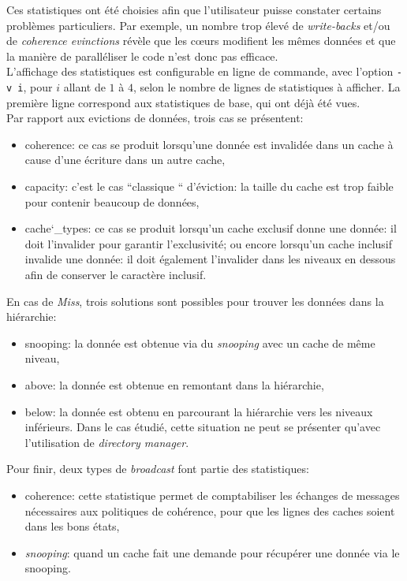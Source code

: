 Ces statistiques ont été choisies afin que l'utilisateur puisse constater certains problèmes particuliers. Par exemple, un nombre trop élevé de \emph{write-backs} et/ou de \emph{coherence evinctions} révèle que les c\oe urs modifient les mêmes données et que la manière de paralléliser le code n'est donc pas efficace. \\

L'affichage des statistiques est configurable en ligne de commande, avec l'option \texttt{-v i}, pour $i$ allant de $1$ à $4$, selon le nombre de lignes de statistiques à afficher. La première ligne correspond aux statistiques de base, qui ont déjà été vues. \\

Par rapport aux evictions de données, trois cas se présentent:
\begin{itemize}
\item coherence: ce cas se produit lorsqu'une donnée est invalidée dans un cache à cause d'une écriture dans un autre cache,
\item capacity: c'est le cas ``classique `` d'éviction: la taille du cache est trop faible pour contenir beaucoup de données,
\item cache\char`_types: ce cas se produit lorsqu'un cache exclusif donne une donnée: il doit l'invalider pour garantir l'exclusivité; ou encore lorsqu'un cache inclusif invalide une donnée: il doit également l'invalider dans les niveaux en dessous afin de conserver le caractère inclusif. \\ 
\end{itemize}

En cas de \emph{Miss}, trois solutions sont possibles pour trouver les données dans la hiérarchie:
\begin{itemize}
\item snooping: la donnée est obtenue via du \emph{snooping} avec un cache de même niveau,
\item above: la donnée est obtenue en remontant dans la hiérarchie,
\item below: la donnée est obtenu en parcourant la hiérarchie vers les niveaux inférieurs. Dans le cas étudié, cette situation ne peut se présenter qu'avec l'utilisation de \emph{directory manager}. \\
\end{itemize}

Pour finir, deux types de \emph{broadcast} font partie des statistiques:
\begin{itemize}
\item coherence: cette statistique permet de comptabiliser les échanges de messages nécessaires aux politiques de cohérence, pour que les lignes des caches soient dans les bons états,
\item \emph{snooping}: quand un cache fait une demande pour récupérer une donnée via le snooping. \\
\end{itemize}


